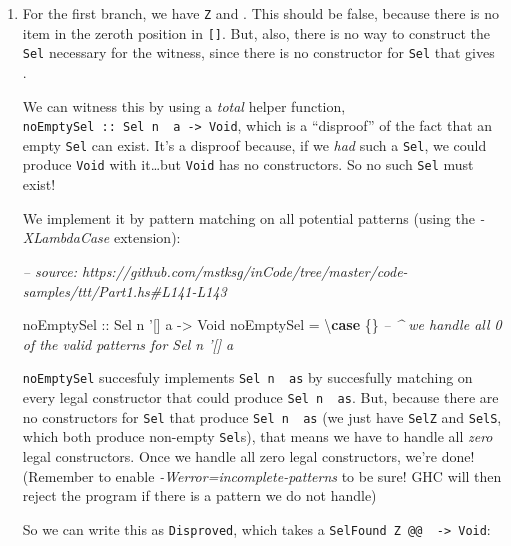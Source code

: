 \documentclass[]{article}
\newenvironment{Shaded}{}{}
\newcommand{\CommentTok}[1]{\textcolor[rgb]{0.38,0.63,0.69}{\textit{#1}}}
\newcommand{\DataTypeTok}[1]{\textcolor[rgb]{0.56,0.13,0.00}{#1}}
\newcommand{\FunctionTok}[1]{\textcolor[rgb]{0.02,0.16,0.49}{#1}}
\newcommand{\KeywordTok}[1]{\textcolor[rgb]{0.00,0.44,0.13}{\textbf{#1}}}
\newcommand{\NormalTok}[1]{#1}
\newcommand{\OtherTok}[1]{\textcolor[rgb]{0.00,0.44,0.13}{#1}}
\begin{document}
\begin{enumerate}
\def\labelenumi{\arabic{enumi}.}
\item
  For the first branch, we have \texttt{\textquotesingle{}Z} and
  \texttt{\textquotesingle{}{[}{]}}. This should be false, because there is no
  item in the zeroth position in \texttt{{[}{]}}. But, also, there is no way to
  construct the \texttt{Sel} necessary for the witness, since there is no
  constructor for \texttt{Sel} that gives \texttt{\textquotesingle{}{[}{]}}.

  We can witness this by using a \emph{total} helper function,
  \texttt{noEmptySel\ ::\ Sel\ n\ \textquotesingle{}{[}{]}\ a\ -\textgreater{}\ Void},
  which is a ``disproof'' of the fact that an empty \texttt{Sel} can exist. It's
  a disproof because, if we \emph{had} such a \texttt{Sel}, we could produce
  \texttt{Void} with it\ldots{}but \texttt{Void} has no constructors. So no such
  \texttt{Sel} must exist!

  We implement it by pattern matching on all potential patterns (using the
  \emph{-XLambdaCase} extension):

\begin{Shaded}
\begin{Highlighting}[]
\CommentTok{-- source: https://github.com/mstksg/inCode/tree/master/code-samples/ttt/Part1.hs#L141-L143}

\OtherTok{noEmptySel ::} \DataTypeTok{Sel}\NormalTok{ n '[] a }\OtherTok{->} \DataTypeTok{Void}
\NormalTok{noEmptySel }\FunctionTok{=}\NormalTok{ \textbackslash{}}\KeywordTok{case}\NormalTok{ \{\}}
            \CommentTok{-- ^ we handle all 0 of the valid patterns for Sel n '[] a}
\end{Highlighting}
\end{Shaded}

  \texttt{noEmptySel} succesfuly implements
  \texttt{Sel\ n\ \textquotesingle{}{[}{]}\ as} by succesfully matching on every
  legal constructor that could produce
  \texttt{Sel\ n\ \textquotesingle{}{[}{]}\ as}. But, because there are no
  constructors for \texttt{Sel} that produce
  \texttt{Sel\ n\ \textquotesingle{}{[}{]}\ as} (we just have \texttt{SelZ} and
  \texttt{SelS}, which both produce non-empty \texttt{Sel}s), that means we have
  to handle all \emph{zero} legal constructors. Once we handle all zero legal
  constructors, we're done! (Remember to enable
  \emph{-Werror=incomplete-patterns} to be sure! GHC will then reject the
  program if there is a pattern we do not handle)

  So we can write this as \texttt{Disproved}, which takes a
  \texttt{SelFound\ \textquotesingle{}Z\ @@\ \textquotesingle{}{[}{]}\ -\textgreater{}\ Void}:


\end{enumerate}
\end{document}
